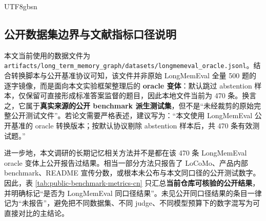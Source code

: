 \documentclass[a4paper,fleqn]{cas-sc}
\begin{document}
\begin{CJK*}{UTF8}{gbsn}
\subsection{公开数据集边界与文献指标口径说明}

本文当前使用的数据文件为 \texttt{artifacts/long\_term\_memory\_graph/datasets/longmemeval\_oracle.jsonl}。结合转换脚本与公开基准协议可知，该文件并非原始 LongMemEval 全量 500 题的逐字镜像，而是面向本文实验框架整理后的 \textbf{oracle 变体}：默认跳过 abstention 样本，仅保留可直接形成标准答案监督的题目，因此本地文件当前为 470 条。换言之，它属于\textbf{真实来源的公开 benchmark 派生测试集}，但不是“未经裁剪的原始完整公开测试文件”。若论文需要严格表述，建议写为：“本文使用 LongMemEval 公开基准的 oracle 转换版本；按默认协议剔除 abstention 样本后，共 470 条有效测试题。”

进一步地，本文调研的长期记忆相关方法并不是都在该 470 条 LongMemEval oracle 变体上公开报告过结果。相当一部分方法只报告了 LoCoMo、产品内部 benchmark、README 宣传分数，或根本未公布与本文同口径的公开测试数字。因此，表 \ref{tab:public-benchmark-metrics-cn} 只汇总\textbf{当前仓库可核验的公开结果}，并明确标记“是否为 LongMemEval 同口径结果”。未见公开同口径结果的条目一律记为“未报告”，避免把不同数据集、不同 judge、不同模型预算下的数字混写为可直接对比的主结论。


\end{CJK*}
\end{document}
